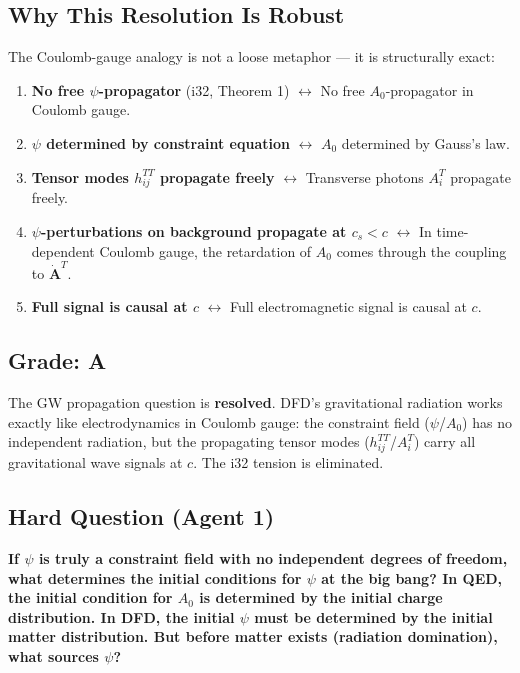 \documentclass[11pt,a4paper]{article}
\begin{document}
\subsection{Why This Resolution Is Robust}

The Coulomb-gauge analogy is not a loose metaphor --- it is structurally exact:

\begin{enumerate}
\item \textbf{No free $\psi$-propagator} (i32, Theorem 1) $\leftrightarrow$ No free $A_0$-propagator in Coulomb gauge.
\item \textbf{$\psi$ determined by constraint equation} $\leftrightarrow$ $A_0$ determined by Gauss's law.
\item \textbf{Tensor modes $h_{ij}^{TT}$ propagate freely} $\leftrightarrow$ Transverse photons $A_i^T$ propagate freely.
\item \textbf{$\psi$-perturbations on background propagate at $c_s < c$} $\leftrightarrow$ In time-dependent Coulomb gauge, the retardation of $A_0$ comes through the coupling to $\dot{\mathbf{A}}^T$.
\item \textbf{Full signal is causal at $c$} $\leftrightarrow$ Full electromagnetic signal is causal at $c$.
\end{enumerate}

\subsection{Grade: A}

The GW propagation question is \textbf{resolved}. DFD's gravitational radiation works exactly like electrodynamics in Coulomb gauge: the constraint field ($\psi$/$A_0$) has no independent radiation, but the propagating tensor modes ($h_{ij}^{TT}$/$A_i^T$) carry all gravitational wave signals at $c$. The i32 tension is eliminated.

\subsection{Hard Question (Agent 1)}

\textbf{If $\psi$ is truly a constraint field with no independent degrees of freedom, what determines the initial conditions for $\psi$ at the big bang? In QED, the initial condition for $A_0$ is determined by the initial charge distribution. In DFD, the initial $\psi$ must be determined by the initial matter distribution. But before matter exists (radiation domination), what sources $\psi$?}
\end{document}
